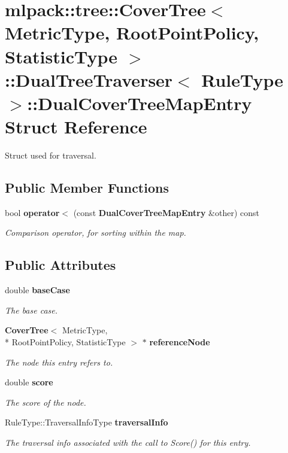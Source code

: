 \section{mlpack\-:\-:tree\-:\-:Cover\-Tree$<$ Metric\-Type, Root\-Point\-Policy, Statistic\-Type $>$\-:\-:Dual\-Tree\-Traverser$<$ Rule\-Type $>$\-:\-:Dual\-Cover\-Tree\-Map\-Entry Struct Reference}
\label{structmlpack_1_1tree_1_1CoverTree_1_1DualTreeTraverser_1_1DualCoverTreeMapEntry}


Struct used for traversal.  


\subsection*{Public Member Functions}
\begin{DoxyCompactItemize}
\item 
bool {\bf operator$<$} (const {\bf Dual\-Cover\-Tree\-Map\-Entry} \&other) const 
\begin{DoxyCompactList}\small\item\em Comparison operator, for sorting within the map. \end{DoxyCompactList}\end{DoxyCompactItemize}
\subsection*{Public Attributes}
\begin{DoxyCompactItemize}
\item 
double {\bf base\-Case}
\begin{DoxyCompactList}\small\item\em The base case. \end{DoxyCompactList}\item 
{\bf Cover\-Tree}$<$ Metric\-Type, \\*
Root\-Point\-Policy, Statistic\-Type $>$ $\ast$ {\bf reference\-Node}
\begin{DoxyCompactList}\small\item\em The node this entry refers to. \end{DoxyCompactList}\item 
double {\bf score}
\begin{DoxyCompactList}\small\item\em The score of the node. \end{DoxyCompactList}\item 
Rule\-Type\-::\-Traversal\-Info\-Type {\bf traversal\-Info}
\begin{DoxyCompactList}\small\item\em The traversal info associated with the call to Score() for this entry. \end{DoxyCompactList}\end{DoxyCompactItemize}


